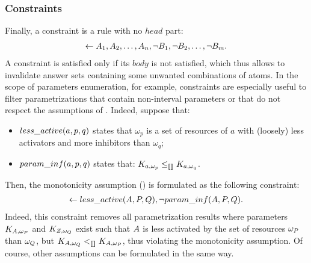 
\subsubsection{Constraints}\label{sssec:constraints}
Finally, a constraint is a rule with no $head$ part:
\begin{align*}
  \leftarrow A_1, A_2, \dots, A_n, \neg B_1, \neg B_2, \dots, \neg B_m.
\end{align*}
A constraint is satisfied only if its $body$ is not satisfied,
which thus allows to invalidate answer sets containing some unwanted combinations of atoms.
In the scope of parameters enumeration, for example, constraints are especially useful to filter parametrizations
that contain non-interval parameters or that do not respect the assumptions of .
Indeed, suppose that:
\begin{itemize}
  \item $less\_active(a, p, q)$ states that $\omega_p$ is a set of resources of $a$ with (loosely) less activators and more inhibitors than $\omega_q$;
  \item $param\_inf(a, p, q)$ states that: $K_{a,\omega_p} \leq_{\llbracket\rrbracket} K_{a,\omega_q}$.
\end{itemize}
Then, the monotonicity assumption () is formulated as the following constraint:
\begin{align*}
  \leftarrow less\_active(A, P, Q), \neg param\_inf(A, P, Q).
\end{align*}
Indeed, this constraint removes all parametrization results where parameters $K_{A,\omega_P}$ and $K_{Z,\omega_Q}$ exist
such that $A$ is less activated by the set of resources $\omega_P$ than $\omega_Q$,
but $K_{A,\omega_Q} <_{\llbracket\rrbracket} K_{A,\omega_P}$,
thus violating the monotonicity assumption.
Of course, other assumptions can be formulated in the same way.

